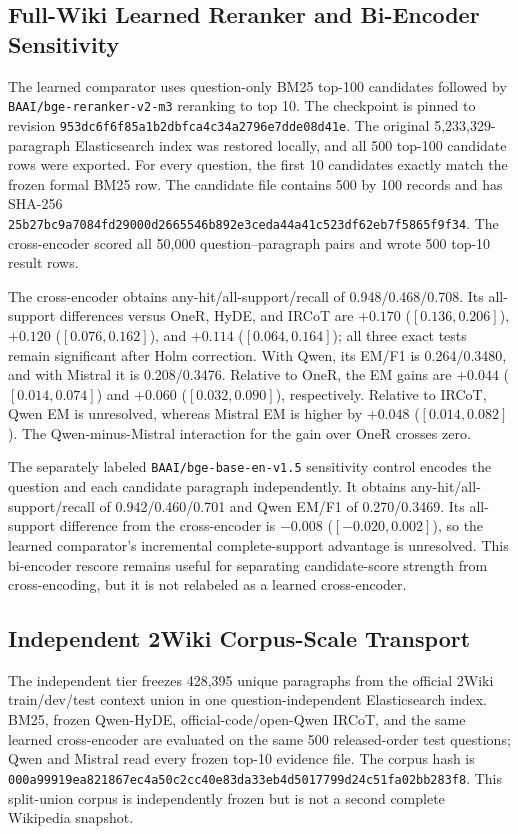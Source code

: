 \documentclass[pdflatex,sn-basic,Numbered]{sn-jnl}
\begin{document}
\subsection{Full-Wiki Learned Reranker and Bi-Encoder Sensitivity}

The learned comparator uses question-only BM25 top-100 candidates followed by \texttt{BAAI/bge-reranker-v2-m3} reranking to top 10. The checkpoint is pinned to revision \texttt{953dc6f6f85a1b2dbfca4c34a2796e7dde08d41e}. The original 5,233,329-paragraph Elasticsearch index was restored locally, and all 500 top-100 candidate rows were exported. For every question, the first 10 candidates exactly match the frozen formal BM25 row. The candidate file contains 500 by 100 records and has SHA-256 \texttt{25b27bc9a7084fd29000d2665546b892e3ceda44a41c523df62eb7f5865f9f34}. The cross-encoder scored all 50,000 question--paragraph pairs and wrote 500 top-10 result rows.

The cross-encoder obtains any-hit/all-support/recall of 0.948/0.468/0.708. Its all-support differences versus OneR, HyDE, and IRCoT are $+0.170$ ($[0.136,0.206]$), $+0.120$ ($[0.076,0.162]$), and $+0.114$ ($[0.064,0.164]$); all three exact tests remain significant after Holm correction. With Qwen, its EM/F1 is 0.264/0.3480, and with Mistral it is 0.208/0.3476. Relative to OneR, the EM gains are $+0.044$ ($[0.014,0.074]$) and $+0.060$ ($[0.032,0.090]$), respectively. Relative to IRCoT, Qwen EM is unresolved, whereas Mistral EM is higher by $+0.048$ ($[0.014,0.082]$). The Qwen-minus-Mistral interaction for the gain over OneR crosses zero.

The separately labeled \texttt{BAAI/bge-base-en-v1.5} sensitivity control encodes the question and each candidate paragraph independently. It obtains any-hit/all-support/recall of 0.942/0.460/0.701 and Qwen EM/F1 of 0.270/0.3469. Its all-support difference from the cross-encoder is $-0.008$ ($[-0.020,0.002]$), so the learned comparator's incremental complete-support advantage is unresolved. This bi-encoder rescore remains useful for separating candidate-score strength from cross-encoding, but it is not relabeled as a learned cross-encoder.



\subsection{Independent 2Wiki Corpus-Scale Transport}

The independent tier freezes 428,395 unique paragraphs from the official 2Wiki train/dev/test context union in one question-independent Elasticsearch index. BM25, frozen Qwen-HyDE, official-code/open-Qwen IRCoT, and the same learned cross-encoder are evaluated on the same 500 released-order test questions; Qwen and Mistral read every frozen top-10 evidence file. The corpus hash is \texttt{000a99919ea821867ec4a50c2cc40e83da33eb4d5017799d24c51fa02bb283f8}. This split-union corpus is independently frozen but is not a second complete Wikipedia snapshot.
\end{document}
